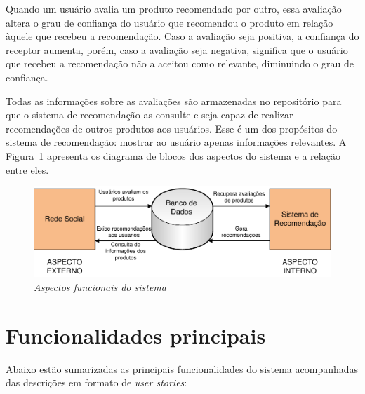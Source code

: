  Quando um usuário avalia um produto recomendado por outro, essa avaliação altera o grau de confiança do usuário que recomendou o produto em relação àquele que recebeu a recomendação. Caso a avaliação seja positiva, a confiança do receptor aumenta, porém, caso a avaliação seja negativa, significa que o usuário que recebeu a recomendação não a aceitou como relevante, diminuindo o grau de confiança.

 Todas as informações sobre as avaliações são armazenadas no repositório para que o sistema de recomendação as consulte e seja capaz de realizar recomendações de outros produtos aos usuários. Esse é um dos propósitos do sistema de recomendação: mostrar ao usuário apenas informações relevantes. A Figura~\ref{fig:aspectos_funcionais} apresenta os diagrama de blocos dos aspectos do sistema e a relação entre eles.
 
\begin{figure}
 \centering
 \includegraphics[width=\textwidth]{imagens/Implementacao_Detalhe2}
 \caption{\it Aspectos funcionais do sistema}
 \label{fig:aspectos_funcionais}
\end{figure}

\section{Funcionalidades principais} %
\label{sec:funcionalidades_principais}

Abaixo estão sumarizadas as principais funcionalidades do sistema acompanhadas das descrições em formato de \textit{user stories}\cite{557458}:

